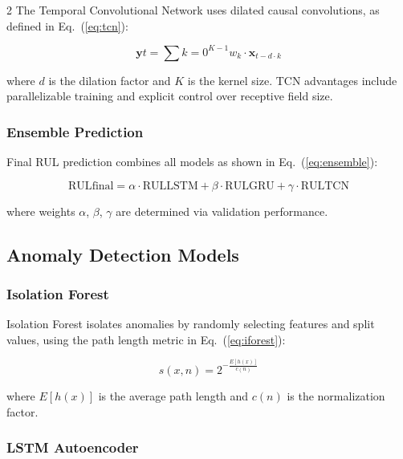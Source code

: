 \documentclass{ijceds} %
\newcommand{\equref}[1]{Eq.~(\ref{#1})} %
\begin{document}
\begin{multicols}{2}
The Temporal Convolutional Network uses dilated causal convolutions, as defined in \equref{eq:tcn}:

\begin{equation}
    \mathbf{y}t = \sum{k=0}^{K-1} w_k \cdot \mathbf{x}_{t - d \cdot k}
    \label{eq:tcn}
\end{equation}

where $d$ is the dilation factor and $K$ is the kernel size. TCN advantages include parallelizable training and explicit control over receptive field size.

\subsubsection{Ensemble Prediction}

Final RUL prediction combines all models as shown in \equref{eq:ensemble}:

\begin{equation}
    \text{RUL}{\text{final}} = \alpha \cdot \text{RUL}{\text{LSTM}} + \beta \cdot \text{RUL}{\text{GRU}} + \gamma \cdot \text{RUL}{\text{TCN}}
    \label{eq:ensemble}
\end{equation}

where weights $\alpha$, $\beta$, $\gamma$ are determined via validation performance.

\subsection{Anomaly Detection Models}

\subsubsection{Isolation Forest}

Isolation Forest isolates anomalies by randomly selecting features and split values, using the path length metric in \equref{eq:iforest}:

\begin{equation}
    s(x, n) = 2^{-\frac{E[h(x)]}{c(n)}}
    \label{eq:iforest}
\end{equation}

where $E[h(x)]$ is the average path length and $c(n)$ is the normalization factor.

\subsubsection{LSTM Autoencoder}


\end{multicols}
\end{document}

